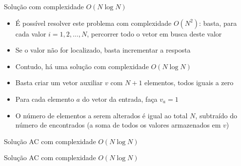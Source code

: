 \begin{frame}[fragile]{Solução com complexidade $O(N\log N)$}

    \begin{itemize}
        \item É possível resolver este problema com complexidade $O(N^2)$: basta, para cada valor
            $i = 1, 2, \ldots, N$, percorrer todo o vetor em busca deste valor

        \item Se o valor não for localizado, basta incrementar a resposta

        \item Contudo, há uma solução com complexidade $O(N\log N)$

        \item Basta criar um vetor auxiliar $v$ com $N + 1$ elementos, todos iguais a zero

        \item Para cada elemento $a$ do vetor da entrada, faça $v_a = 1$

        \item O número de elementos a serem alterados é igual ao total $N$, subtraído do 
            número de encontrados (a soma de todos os valores armazenados em $v$)
   \end{itemize}

\end{frame}

\begin{frame}[fragile]{Solução AC com complexidade $O(N\log N)$}
\end{frame}

\begin{frame}[fragile]{Solução AC com complexidade $O(N\log N)$}
\end{frame}
